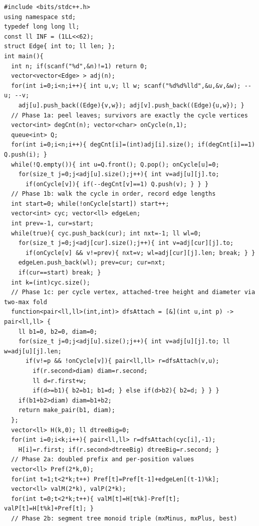 \begin{lstlisting}[caption={CF 835F Summit: peel leaves to isolate the cycle, walk the cycle in order, compute per-vertex attached-tree height and diameter, then a doubled prefix plus a segment tree over triples (mxMinus, mxPlus, best) answers the min-diameter window query. ASCII identifiers, no underscores.}, label={lst:c31-summit}]
#include <bits/stdc++.h>
using namespace std;
typedef long long ll;
const ll INF = (1LL<<62);
struct Edge{ int to; ll len; };
int main(){
  int n; if(scanf("%d",&n)!=1) return 0;
  vector<vector<Edge> > adj(n);
  for(int i=0;i<n;i++){ int u,v; ll w; scanf("%d%d%lld",&u,&v,&w); --u; --v;
    adj[u].push_back((Edge){v,w}); adj[v].push_back((Edge){u,w}); }
  // Phase 1a: peel leaves; survivors are exactly the cycle vertices
  vector<int> degCnt(n); vector<char> onCycle(n,1);
  queue<int> Q;
  for(int i=0;i<n;i++){ degCnt[i]=(int)adj[i].size(); if(degCnt[i]==1) Q.push(i); }
  while(!Q.empty()){ int u=Q.front(); Q.pop(); onCycle[u]=0;
    for(size_t j=0;j<adj[u].size();j++){ int v=adj[u][j].to;
      if(onCycle[v]){ if(--degCnt[v]==1) Q.push(v); } } }
  // Phase 1b: walk the cycle in order, record edge lengths
  int start=0; while(!onCycle[start]) start++;
  vector<int> cyc; vector<ll> edgeLen;
  int prev=-1, cur=start;
  while(true){ cyc.push_back(cur); int nxt=-1; ll wl=0;
    for(size_t j=0;j<adj[cur].size();j++){ int v=adj[cur][j].to;
      if(onCycle[v] && v!=prev){ nxt=v; wl=adj[cur][j].len; break; } }
    edgeLen.push_back(wl); prev=cur; cur=nxt;
    if(cur==start) break; }
  int k=(int)cyc.size();
  // Phase 1c: per cycle vertex, attached-tree height and diameter via two-max fold
  function<pair<ll,ll>(int,int)> dfsAttach = [&](int u,int p) -> pair<ll,ll> {
    ll b1=0, b2=0, diam=0;
    for(size_t j=0;j<adj[u].size();j++){ int v=adj[u][j].to; ll w=adj[u][j].len;
      if(v!=p && !onCycle[v]){ pair<ll,ll> r=dfsAttach(v,u);
        if(r.second>diam) diam=r.second;
        ll d=r.first+w;
        if(d>=b1){ b2=b1; b1=d; } else if(d>b2){ b2=d; } } }
    if(b1+b2>diam) diam=b1+b2;
    return make_pair(b1, diam);
  };
  vector<ll> H(k,0); ll dtreeBig=0;
  for(int i=0;i<k;i++){ pair<ll,ll> r=dfsAttach(cyc[i],-1);
    H[i]=r.first; if(r.second>dtreeBig) dtreeBig=r.second; }
  // Phase 2a: doubled prefix and per-position values
  vector<ll> Pref(2*k,0);
  for(int t=1;t<2*k;t++) Pref[t]=Pref[t-1]+edgeLen[(t-1)%k];
  vector<ll> valM(2*k), valP(2*k);
  for(int t=0;t<2*k;t++){ valM[t]=H[t%k]-Pref[t]; valP[t]=H[t%k]+Pref[t]; }
  // Phase 2b: segment tree monoid triple (mxMinus, mxPlus, best)

\end{lstlisting}
